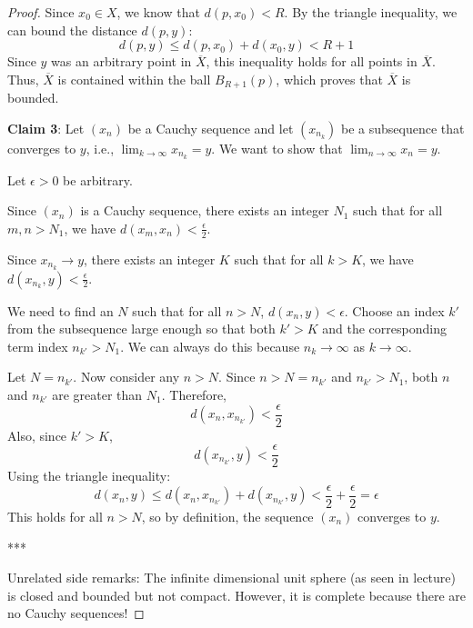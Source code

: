\documentclass[11pt]{article}
\renewcommand{\_}[1]{\underline{ #1 }}
\theoremstyle{definition}
\numberwithin{equation}{subsection}
\begin{document}
\begin{proof}
Since $x_0 \in X$, we know that $d(p, x_0) < R$.
By the triangle inequality, we can bound the distance $d(p, y)$:
$$ d(p, y) \leq d(p, x_0) + d(x_0, y) < R + 1 $$
Since $y$ was an arbitrary point in $\overline{X}$, this inequality holds for all points in $\overline{X}$. Thus, $\overline{X}$ is contained within the ball $B_{R+1}(p)$, which proves that $\overline{X}$ is bounded.

\textbf{Claim 3}:  Let $(x_n)$ be a Cauchy sequence and let $(x_{n_k})$ be a subsequence that converges to $y$, i.e., $\lim_{k \to \infty} x_{n_k} = y$. We want to show that $\lim_{n \to \infty} x_n = y$.

Let $\epsilon > 0$ be arbitrary. 

Since $(x_n)$ is a Cauchy sequence, there exists an integer $N_1$ such that for all $m, n > N_1$, we have $d(x_m, x_n) < \frac{\epsilon}{2}$.

Since $x_{n_k} \to y$, there exists an integer $K$ such that for all $k > K$, we have $d(x_{n_k}, y) < \frac{\epsilon}{2}$.

We need to find an $N$ such that for all $n > N$, $d(x_n, y) < \epsilon$. Choose an index $k'$ from the subsequence large enough so that both $k' > K$ and the corresponding term index $n_{k'} > N_1$. We can always do this because $n_k \to \infty$ as $k \to \infty$.

Let $N = n_{k'}$. Now consider any $n > N$.
Since $n > N = n_{k'}$ and $n_{k'} > N_1$, both $n$ and $n_{k'}$ are greater than $N_1$. Therefore,
$$ d(x_n, x_{n_{k'}}) < \frac{\epsilon}{2} $$
Also, since $k' > K$,
$$ d(x_{n_{k'}}, y) < \frac{\epsilon}{2}  $$
Using the triangle inequality:
$$ d(x_n, y) \leq d(x_n, x_{n_{k'}}) + d(x_{n_{k'}}, y) < \frac{\epsilon}{2} + \frac{\epsilon}{2} = \epsilon $$
This holds for all $n > N$, so by definition, the sequence $(x_n)$ converges to $y$.

*** 

Unrelated side remarks: The infinite dimensional unit sphere (as seen in lecture) is closed and bounded but not compact. However, it is complete because there are no Cauchy sequences!




\end{proof}
\end{document}

